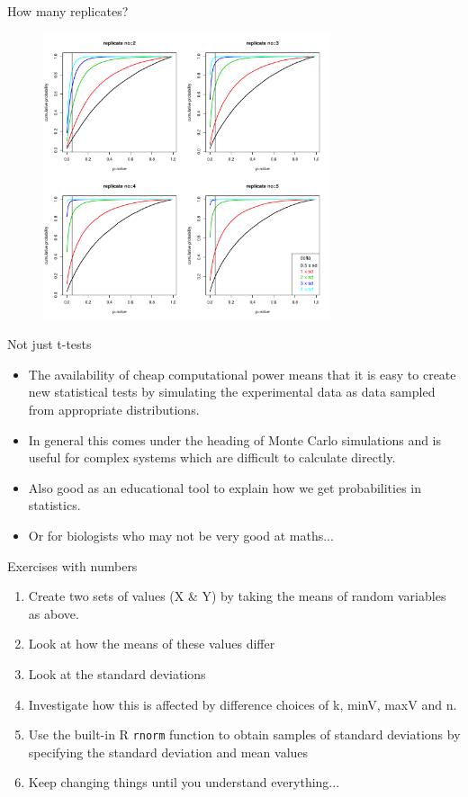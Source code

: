 \documentclass[pdf]{beamer}
\begin{document}
\begin{frame}{How many replicates?}
  \begin{figure}[ht]
    \includegraphics[width=0.75\textwidth]{R/replicate_numbers}
  \end{figure}
\end{frame}
  

\begin{frame}{Not just t-tests}
  \begin{itemize}
  \item The availability of cheap computational power means that it
    is easy to create new statistical tests by simulating the
    experimental data as data sampled from appropriate distributions.
  \item In general this comes under the heading of Monte Carlo simulations
    and is useful for complex systems which are difficult to calculate
    directly.
  \item Also good as an educational tool to explain how we get probabilities
    in statistics.
  \item Or for biologists who may not be very good at maths...
  \end{itemize}
\end{frame}

\begin{frame}{Exercises with numbers}
  \begin{enumerate}
  \item Create two sets of values (X \& Y) by taking the means of random
    variables as above.
  \item Look at how the means of these values differ
  \item Look at the standard deviations
  \item Investigate how this is affected by difference choices of k, minV,
    maxV and n.
  \item Use the built-in R \texttt{rnorm} function to obtain samples of
    standard deviations by specifying the standard deviation and mean values
  \item Keep changing things until you understand everything...
  \end{enumerate}
\end{frame}
\end{document}
